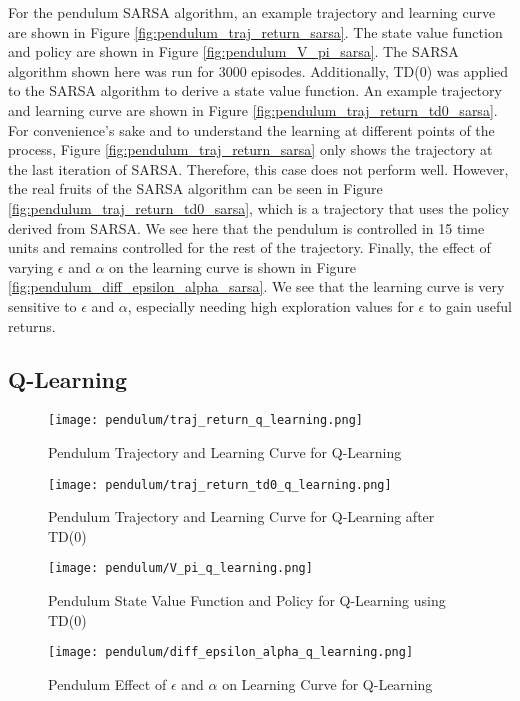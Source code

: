 For the pendulum SARSA algorithm, an example trajectory and learning curve are shown in Figure \ref{fig:pendulum_traj_return_sarsa}. The state value function and policy are shown in Figure \ref{fig:pendulum_V_pi_sarsa}. The SARSA algorithm shown here was run for 3000 episodes. Additionally, TD(0) was applied to the SARSA algorithm to derive a state value function. An example trajectory and learning curve are shown in Figure \ref{fig:pendulum_traj_return_td0_sarsa}. For convenience's sake and to understand the learning at different points of the process, Figure \ref{fig:pendulum_traj_return_sarsa} only shows the trajectory at the last iteration of SARSA. Therefore, this case does not perform well. However, the real fruits of the SARSA algorithm can be seen in Figure \ref{fig:pendulum_traj_return_td0_sarsa}, which is a trajectory that uses the policy derived from SARSA. We see here that the pendulum is controlled in 15 time units and remains controlled for the rest of the trajectory. Finally, the effect of varying $\epsilon$ and $\alpha$ on the learning curve is shown in Figure \ref{fig:pendulum_diff_epsilon_alpha_sarsa}. We see that the learning curve is very sensitive to $\epsilon$ and $\alpha$, especially needing high exploration values for $\epsilon$ to gain useful returns.

\subsection*{Q-Learning}
\begin{figure}[ht]
\centering
\texttt{[image: pendulum/traj\_return\_q\_learning.png]}
\caption{Pendulum Trajectory and Learning Curve for Q-Learning}
\label{fig:pendulum_traj_return_q_learning}
\end{figure}

\begin{figure}[ht]
\centering
\texttt{[image: pendulum/traj\_return\_td0\_q\_learning.png]}
\caption{Pendulum Trajectory and Learning Curve for Q-Learning after TD(0)}
\label{fig:pendulum_traj_return_td0_q_learning}
\end{figure}

\begin{figure}[ht]
\centering
\texttt{[image: pendulum/V\_pi\_q\_learning.png]}
\caption{Pendulum State Value Function and Policy for Q-Learning using TD(0)}
\label{fig:pendulum_V_pi_q_learning}
\end{figure}

\begin{figure}
\centering
\texttt{[image: pendulum/diff\_epsilon\_alpha\_q\_learning.png]}
\caption{Pendulum Effect of $\epsilon$ and $\alpha$ on Learning Curve for Q-Learning}
\label{fig:pendulum_diff_epsilon_alpha_q_learning}
\end{figure}

